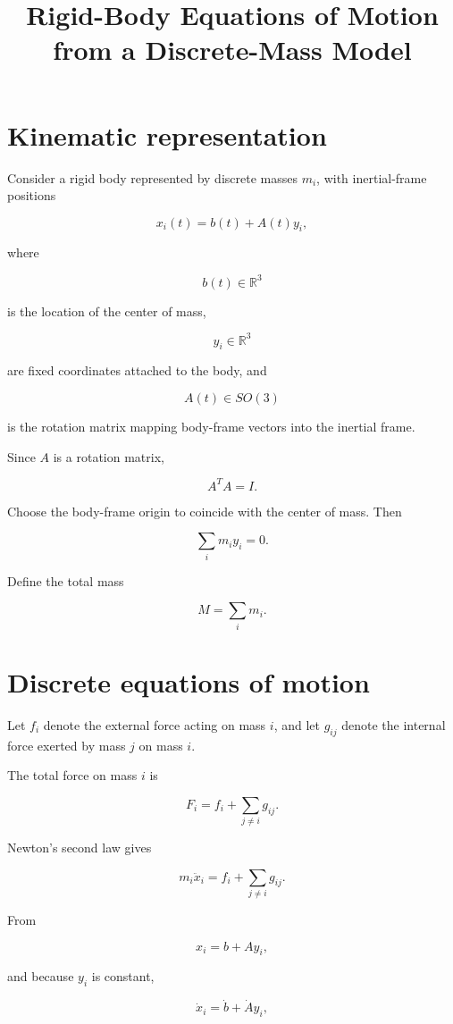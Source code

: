 \documentclass{article}
\title{Rigid-Body Equations of Motion from a Discrete-Mass Model}
\author{}
\date{}
\begin{document}
\maketitle

\section{Kinematic representation}

Consider a rigid body represented by discrete masses \(m_i\), with inertial-frame positions

\[
x_i(t) = b(t) + A(t)y_i,
\]

where

\[
b(t) \in \mathbb{R}^3
\]

is the location of the center of mass,

\[
y_i \in \mathbb{R}^3
\]

are fixed coordinates attached to the body, and

\[
A(t) \in SO(3)
\]

is the rotation matrix mapping body-frame vectors into the inertial frame.

Since \(A\) is a rotation matrix,

\[
A^T A = I.
\]

Choose the body-frame origin to coincide with the center of mass. Then

\[
\sum_i m_i y_i = 0.
\]

Define the total mass

\[
M = \sum_i m_i.
\]

\section{Discrete equations of motion}

Let \(f_i\) denote the external force acting on mass \(i\), and let \(g_{ij}\) denote the internal force exerted by mass \(j\) on mass \(i\).

The total force on mass \(i\) is

\[
F_i = f_i+\sum_{j\ne i}g_{ij}.
\]

Newton's second law gives

\[
m_i\ddot{x}_i = f_i+\sum_{j\ne i}g_{ij}.
\]

From

\[
x_i=b+Ay_i,
\]

and because \(y_i\) is constant,

\[
\dot{x}_i = \dot{b}+\dot{A}y_i,
\]
\end{document}
